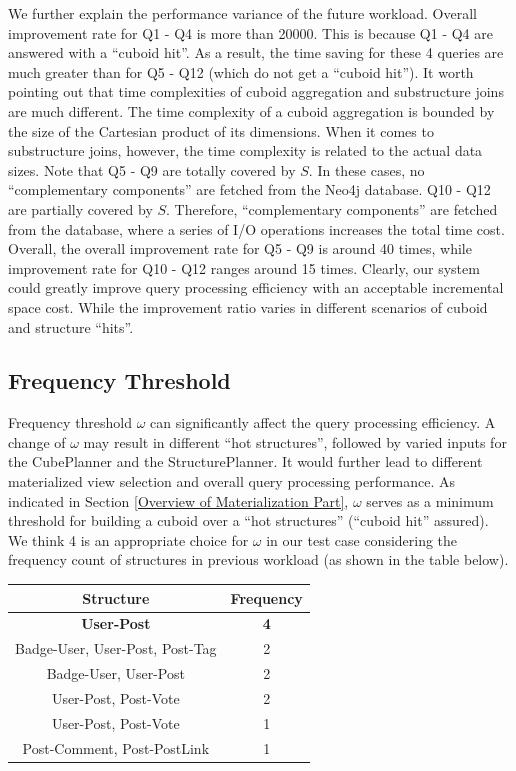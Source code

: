 We further explain the performance variance of the future workload. Overall improvement rate for Q1 - Q4 is more than 20000. This is because Q1 - Q4 are answered with a ``cuboid hit''. As a result, the time saving for these 4 queries are much greater than for Q5 - Q12 (which do not get a ``cuboid hit''). It worth pointing out that time complexities of cuboid aggregation and substructure joins are much different. The time complexity of a cuboid aggregation is bounded by the size of the Cartesian product of its dimensions. When it comes to substructure joins, however, the time complexity is related to the actual data sizes. Note that Q5 - Q9 are totally covered by $S$. In these cases, no ``complementary components'' are fetched from the Neo4j database.  Q10 - Q12 are partially covered by $S$.  Therefore, ``complementary components'' are fetched from the database, where a series of I/O operations increases the total time cost.  Overall, the overall improvement rate for Q5 - Q9 is around 40 times, while improvement rate for Q10 - Q12 ranges around 15 times. Clearly, our system could greatly improve query processing efficiency with an acceptable incremental space cost. While the improvement ratio varies in different scenarios of cuboid and structure ``hits''.




\subsection{Frequency Threshold}
\label{Frequency Threshold}
Frequency threshold $\omega$ can significantly affect the query processing efficiency. A change of $\omega$ may result in different ``hot structures'', followed by varied inputs for the CubePlanner and the StructurePlanner. It would further lead to different materialized view selection and overall query processing performance. As indicated in Section \ref{Overview of Materialization Part}, $\omega$ serves as a minimum threshold for building a cuboid over a ``hot structures'' (``cuboid hit'' assured). We think 4 is an appropriate choice for $\omega$ in our test case considering the frequency count of structures in previous workload (as shown in the table below).

\begin{center}
	\begin{tabular}{ | c | c |}
		\hline
		Structure	&Frequency	\\ \hline
		\textbf{User-Post} 	&\textbf{4} \\ \hline
		Badge-User, User-Post, Post-Tag 	&2 \\ \hline
		Badge-User, User-Post	&2 \\ \hline
		User-Post, Post-Vote	&2 \\ \hline
		User-Post, Post-Vote	&1 \\ \hline
		Post-Comment, Post-PostLink	&1 \\ \hline
	\end{tabular}
	\end {center}
	
